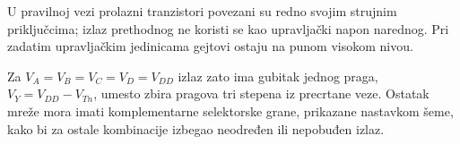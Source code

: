 U pravilnoj vezi prolazni tranzistori povezani su redno svojim strujnim priključcima; izlaz prethodnog ne koristi se kao upravljački napon narednog. Pri zadatim upravljačkim jedinicama gejtovi ostaju na punom visokom nivou.

Za $V_A=V_B=V_C=V_D=V_{DD}$ izlaz zato ima gubitak jednog praga, $V_Y=V_{DD}-V_{Tn}$, umesto zbira pragova tri stepena iz precrtane veze. Ostatak mreže mora imati komplementarne selektorske grane, prikazane nastavkom šeme, kako bi za ostale kombinacije izbegao neodređen ili nepobuđen izlaz.
